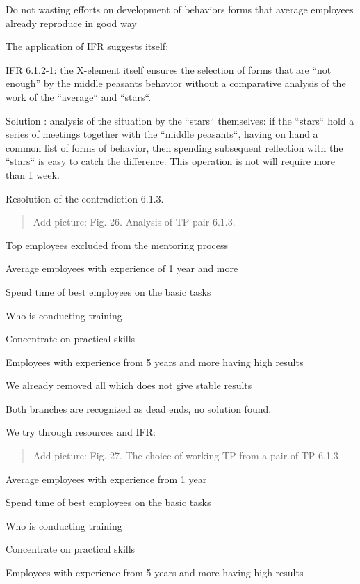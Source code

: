 \documentclass[11pt,a4paper]{book}
\newcommand{\addpicture}[1]{
  \begin{quote} Add picture: #1\end{quote}
}
\begin{document}
Do not wasting efforts on development of behaviors forms that average
employees already reproduce in good way


The application of IFR suggests itself:

IFR 6.1.2-1: the X-element itself ensures the selection of forms that are “not
enough” by the middle peasants behavior without a comparative analysis of the
work of the “average“ and “stars“.

Solution : analysis of the situation by the “stars“ themselves: if the “stars“
hold a series of meetings together with the “middle peasants“, having on hand
a common list of forms of behavior, then spending subsequent reflection with
the “stars“ is easy to catch the difference. This operation is not will
require more than 1 week.

Resolution of the contradiction 6.1.3.


\addpicture{Fig. 26. Analysis of TP pair 6.1.3.}

Top employees excluded from the mentoring process

Average employees with experience of 1 year and more 

Spend time of best employees on the basic tasks

Who is conducting training

Concentrate on practical skills

Employees with experience from 5 years and more having high results

We already removed all which does not give stable results


Both branches are recognized as dead ends, no solution found.

We try through resources and IFR:


\addpicture{Fig. 27. The choice of working TP from a pair of TP 6.1.3}

Average employees with experience from 1 year

Spend time of best employees on the basic tasks

Who is conducting training

Concentrate on practical skills

Employees with experience from 5 years and more having high results

\end{document}
